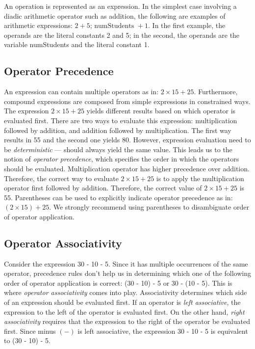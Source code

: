 An operation is represented as an {expression}. In the simplest
case involving a diadic arithmetic operator such as addition, the
following are examples of arithmetic expressions: $2 + 5$; $\mbox{
numStudents } + 1$. In the first example, the operands are the
literal constants 2 and 5; in the second, the operands are the
variable numStudents and the literal constant 1.


\subsection{Operator Precedence}

An expression can contain multiple operators as in: $2 \times 15 +
25$. Furthermore, compound expressions are composed from simple
expressions in constrained ways. The expression $2 \times 15 + 25$
yields different results based on which operator is evaluated
first. There are two ways to evaluate this expression:
multiplication followed by addition, and addition followed by
multiplication. The first way results in 55 and the second one
yields 80. However, expression evaluation need to be
\emph{deterministic} --- should always yield the same value. This
leads us to the notion of \emph{operator precedence}, which
specifies the order in which the operators should be evaluated.
Multiplication operator has higher precedence over addition.
Therefore, the correct way to evaluate $2 \times 15 + 25$ is to
apply the multiplication operator first followed by addition.
Therefore, the correct value of $2 \times 15 + 25$ is 55.
Parentheses can be used to explicitly indicate operator precedence
as in: $(2 \times 15) + 25$. We strongly recommend using
parentheses to disambiguate order of operator application.


\subsection{Operator Associativity}

Consider the expression 30 - 10 - 5. Since it has multiple
occurrences of the same operator, precedence rules don't help us
in determining which one of the following order of operator
application is correct: (30 - 10) - 5 or 30 - (10 - 5). This is
where \emph{operator associativity} comes into play. Associativity
determines which side of an expression should be evaluated first.
If an operator is \emph{left associative}, the expression to the
left of the operator is evaluated first. On the other hand,
\emph{right associativity} requires that the expression to the
right of the operator be evaluated first. Since minus $(-)$ is
left associative, the expression 30 - 10 - 5 is equivalent to (30
- 10) - 5.


